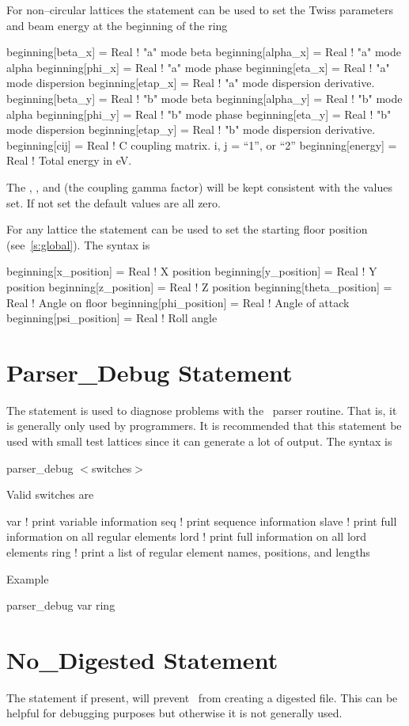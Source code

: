 For non--circular lattices the  statement can be used to
set the Twiss parameters and beam energy at the beginning of the ring
\begin{example}
  beginning[beta_x]  = Real  ! "a" mode beta
  beginning[alpha_x] = Real  ! "a" mode alpha
  beginning[phi_x]   = Real  ! "a" mode phase
  beginning[eta_x]   = Real  ! "a" mode dispersion
  beginning[etap_x]  = Real  ! "a" mode dispersion derivative.
  beginning[beta_y]  = Real  ! "b" mode beta
  beginning[alpha_y] = Real  ! "b" mode alpha
  beginning[phi_y]   = Real  ! "b" mode phase
  beginning[eta_y]   = Real  ! "b" mode dispersion
  beginning[etap_y]  = Real  ! "b" mode dispersion derivative.
  beginning[cij]     = Real  ! C coupling matrix. i, j = {``1'', or ``2''} 
  beginning[energy]  = Real  ! Total energy in eV.
\end{example}
The , , and  (the coupling gamma factor) 
will be kept consistent with the values set. If not set the default values are all zero. 

For any lattice the  statement can be used to set the starting floor position 
(see~\ref{s:global}). The syntax is
\begin{example}
  beginning[x_position]     = Real  ! X position
  beginning[y_position]     = Real  ! Y position
  beginning[z_position]     = Real  ! Z position
  beginning[theta_position] = Real  ! Angle on floor
  beginning[phi_position]   = Real  ! Angle of attack
  beginning[psi_position]   = Real  ! Roll angle
\end{example}

\section{Parser\_Debug Statement}

The  statement is used to diagnose problems with the
\bmad\ parser routine. That is, it is generally only used by
programmers.  It is recommended that this statement be used with small
test lattices since it can generate a lot of output.  The syntax is
\begin{example}
  parser\_debug \(<\)switches\(>\)
\end{example}
Valid switches are
\begin{example}
  var     ! print variable information
  seq     ! print sequence information
  slave   ! print full information on all regular elements
  lord    ! print full information on all lord elements
  ring    ! print a list of regular element names, positions, and lengths
\end{example}
Example
\begin{example}
  parser\_debug var ring
\end{example}


\section{No\_Digested Statement}

The  statement if present, will prevent \bmad\ from 
creating a digested file. This can be helpful for debugging purposes but
otherwise it is not generally used.


